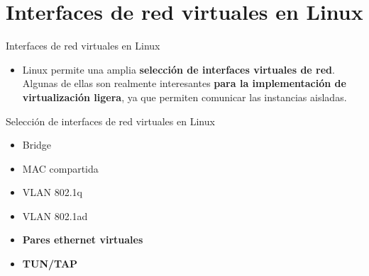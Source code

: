 \documentclass[aspectratio=169,xcolor=dvipsnames]{beamer}
\begin{document}
	
	\section{Interfaces de red virtuales en Linux}
	
	\begin{frame}{Interfaces de red virtuales en Linux}
		\begin{itemize}
		    \item Linux permite una amplia \textbf{selección de interfaces virtuales de red}. Algunas de ellas son realmente interesantes \textbf{para la implementación de virtualización ligera}, ya que permiten comunicar las instancias aisladas.
		\end{itemize}
		
		\begin{alertblock}{Selección de interfaces de red virtuales en Linux}
		    \begin{itemize}
		        \item Bridge
		        \item MAC compartida
		        \item VLAN 802.1q
		        \item VLAN 802.1ad
		        \item \textbf{Pares ethernet virtuales}
		        \item \textbf{TUN/TAP}
		    \end{itemize}
		\end{alertblock}
	\end{frame}
	
\end{document}
